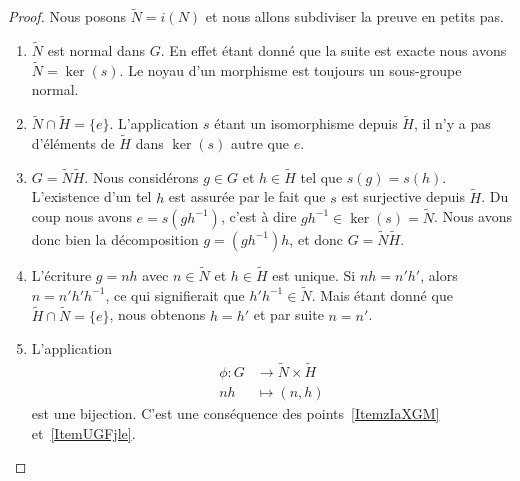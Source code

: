 \begin{proof}
    Nous posons \( \tilde N=i(N)\) et nous allons subdiviser la preuve en petits pas.

    \begin{enumerate}
        \item  \( \tilde N\) est normal dans \( G\). En effet étant donné que la suite est exacte nous avons \( \tilde N=\ker(s)\). Le noyau d'un morphisme est toujours un sous-groupe normal.

        \item \( \tilde N\cap\tilde H=\{ e \}\). L'application \( s\) étant un isomorphisme depuis $\tilde H$, il n'y a pas d'éléments de \( \tilde H\) dans \( \ker(s)\) autre que $e$.

        \item\label{ItemzIaXGM} \( G=\tilde N\tilde H\). Nous considérons \( g\in G\) et \( h\in \tilde H\) tel que \( s(g)=s(h)\). L'existence d'un tel \( h\) est assurée par le fait que \( s\) est surjective depuis \( \tilde H\). Du coup nous avons \( e=s(gh^{-1})\), c'est à dire \( gh^{-1}\in \ker (s)=\tilde N\). Nous avons donc bien la décomposition \( g=(gh^{-1})h\), et donc \( G=\tilde N\tilde H\).

        \item\label{ItemUGFjle} L'écriture \( g=nh\) avec \( n\in \tilde N\) et \( h\in \tilde H\) est unique. Si \( nh=n'h'\), alors \( n=n'h'h^{-1}\), ce qui signifierait que \( h'h^{-1}\in\tilde N\). Mais étant donné que \( \tilde H\cap\tilde N=\{ e \}\), nous obtenons \( h=h'\) et par suite \( n=n'\).

        \item   \label{ItemUZlrKo}
            L'application
            \begin{equation}
                \begin{aligned}
                    \phi\colon G&\to \tilde N\times \tilde H \\
                    nh&\mapsto (n,h)
                \end{aligned}
            \end{equation}
            est une bijection. C'est une conséquence des points~\ref{ItemzIaXGM} et~\ref{ItemUGFjle}.


\end{enumerate}
\end{proof}
